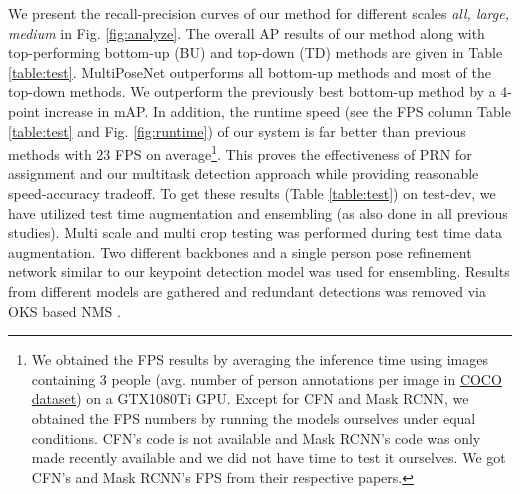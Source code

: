 \documentclass[runningheads]{llncs}
\begin{document}
We present the recall-precision curves of our method for different scales \textit{all, large, medium} in Fig. \ref{fig:analyze}. The overall AP results of our method along with top-performing bottom-up (BU) and top-down (TD) methods are given in  Table \ref{table:test}.  MultiPoseNet outperforms all bottom-up methods and most of the top-down methods. We outperform the previously best bottom-up method\cite{Newell2016b} by a 4-point increase in mAP. In addition, the runtime speed (see the FPS column Table \ref{table:test} and Fig. \ref{fig:runtime}) of our system is far better than previous methods with 23 FPS on average\footnote{We obtained the FPS results by averaging the inference time using images containing 3 people (avg. number of person annotations per image in \href{http://image-net.org/challenges/talks/2016/ECCV2016_workshop_presentation_keypoint.pdf}{COCO dataset}) on a GTX1080Ti GPU. Except for CFN and Mask RCNN, we obtained the FPS numbers by running the models ourselves under equal conditions. CFN’s code is not available and Mask RCNN’s code was only made recently available and we did not have time to test it ourselves. We got CFN’s and Mask RCNN’s FPS from their respective papers.}. This proves the effectiveness of PRN for assignment and our multitask detection approach while providing reasonable speed-accuracy tradeoff. To get these results (Table \ref{table:test}) on test-dev, we have utilized test time augmentation and ensembling (as also done in all previous studies). Multi scale and multi crop testing was performed during test time data augmentation. Two different backbones and a single person pose refinement network similar to our keypoint detection model was used for ensembling. Results from different models are gathered and redundant detections was removed via OKS based NMS \cite{Papandreou2017}. 
\end{document}
